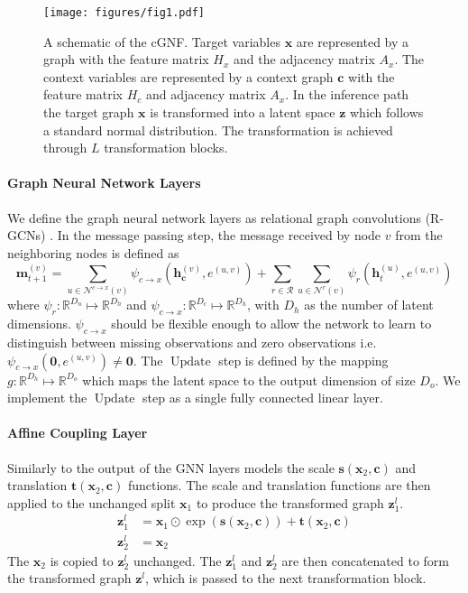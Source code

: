 \documentclass{article} \usepackage{iclr2023_conference,times}
\def\vc{{\bm{c}}}
\def\vx{{\bm{x}}}
\def\vz{{\bm{z}}}
\begin{document}
    \begin{figure}[t!]
\centering
\texttt{[image: figures/fig1.pdf]}
\caption{
 A schematic of the cGNF. Target variables $\vx$ are represented by a graph with the feature matrix $H_{x}$ and the adjacency matrix $A_x$. The context variables are represented by a context graph $\vc$ with the feature matrix $H_c$ and adjacency matrix $A_x$. In the inference path the target graph $\vx$ is transformed into a latent space $\vz$ which follows a standard normal distribution. The transformation is achieved through $L$ transformation blocks.
}

\label{fig:fig1}
\end{figure}

    \paragraph{Graph Neural Network Layers}
    We define the graph neural network layers as relational graph convolutions (R-GCNs) \citep{schlichtkrull2017modeling}.
    In the message passing step, the message received by node $v$ from the neighboring nodes is defined as
    \begin{equation*}
        \mathbf{m}^{(v)}_{t+1}=\sum_{u \in \mathcal{N}^{c\rightarrow x}(v)}\psi_{c\rightarrow x}\left(\mathbf{h}_{\vc}^{(v)}, e^{(u, v)}\right) + \sum_{r \in \mathcal{R}} \sum_{u\in\mathcal{N}^r(v)} \psi_r\left(\mathbf{h}^{(u)}_t, e^{(u, v)}\right)\label{eq:cgnf_message}
    \end{equation*}
    where $\psi_r : \mathbb{R}^{D_n} \mapsto \mathbb{R}^{D_h}$ and $\psi_{c\rightarrow x} : \mathbb{R}^{D_c} \mapsto \mathbb{R}^{D_h}$, with $D_h$ as the number of latent dimensions.
    $\psi_{c\rightarrow x}$ should be flexible enough to allow the network to learn to distinguish between missing observations and zero observations i.e. $\psi_{c\rightarrow x}\left(\mathbf{0}, e^{(u, v)}\right) \ne \mathbf{0}$.
    The $\operatorname{Update}$ step is defined by the mapping $g: \mathbb{R}^{D_h} \mapsto \mathbb{R}^{D_o}$ which maps the latent space to the output dimension of size $D_o$.
    We implement the $\operatorname{Update}$ step as a single fully connected linear layer.

    \paragraph{Affine Coupling Layer}
    Similarly to \citet{Liu_Kumar_Ba_Kiros_Swersky_2019} the output of the GNN layers models the scale $\mathbf{s}(\vx_2, \vc)$ and translation $\mathbf{t}(\vx_2, \vc)$ functions.
    The scale and translation functions are then applied to the unchanged split $\vx_1$ to produce the transformed graph $\vz_1^{l}$.
    \begin{align*}
        \vz_1^{l} &= \vx_1 \odot \exp\left(\mathbf{s}(\vx_2, \vc)\right) + \mathbf t(\vx_2, \vc)\\
        \vz_2^{l} &= \vx_2
    \end{align*}
    The $\vx_2$ is copied to $\vz_2^{l}$ unchanged.
    The $\vz_1^{l}$ and $\vz_2^{l}$ are then concatenated to form the transformed graph $\vz^{l}$, which is passed to the next transformation block.
    
\end{document}
